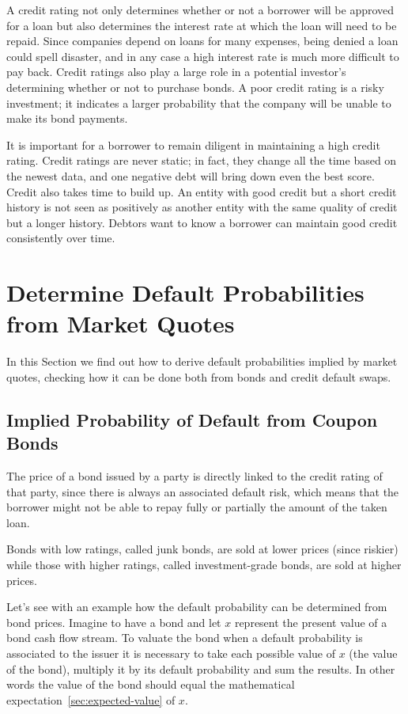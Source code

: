 A credit rating not only determines whether or not a borrower will be approved for a loan but also determines the interest rate at which the loan will need to be repaid. Since companies depend on loans for many expenses, being denied a loan could spell disaster, and in any case a high interest rate is much more difficult to pay back.
Credit ratings also play a large role in a potential investor's determining whether or not to purchase bonds. A poor credit rating is a risky investment; it indicates a larger probability that the company will be unable to make its bond payments.

It is important for a borrower to remain diligent in maintaining a high credit rating. Credit ratings are never static; in fact, they change all the time based on the newest data, and one negative debt will bring down even the best score. 
Credit also takes time to build up. An entity with good credit but a short credit history is not seen as positively as another entity with the same quality of credit but a longer history. Debtors want to know a borrower can maintain good credit consistently over time.

\section{Determine Default Probabilities from Market Quotes}
In this Section we find out how to derive default probabilities implied by market quotes, checking how it can be done both from bonds and credit default swaps.

\subsection{Implied Probability of Default from Coupon Bonds}\label{default-probabilities-and-bond-prices}

The price of a bond issued by a party is directly linked to the credit rating of that party, since there is always an associated default risk, which means that the borrower might not be able to repay fully or partially the amount of the taken loan. 

Bonds with low ratings, called junk bonds, are sold at lower prices (since riskier) while those with higher ratings, called investment-grade bonds, are sold at higher prices.

Let's see with an example how the default probability can be determined from bond prices. Imagine to have a bond and let \(x\) represent the present value of a bond cash flow stream. To valuate the bond when a default probability is associated to the issuer it is necessary to take each possible value of $x$ (the value of the bond), multiply it by its default probability and sum the results.  In other words the value of the bond should equal the mathematical expectation~\ref{sec:expected-value} of $x$.

